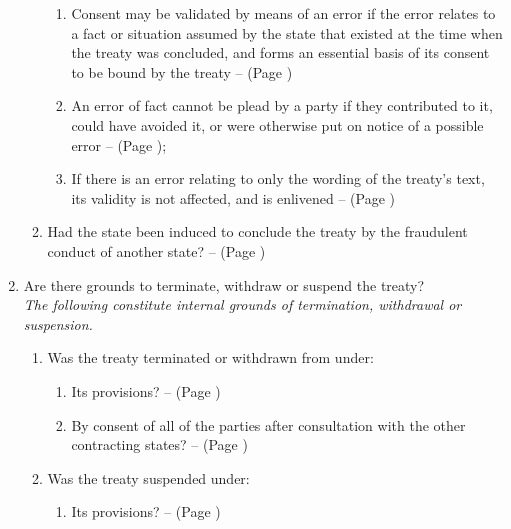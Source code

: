 \begin{enumerate}
\begin{enumerate}
        \begin{enumerate}
            \item Consent may be validated by means of an error if the error relates to a fact or situation assumed by the state that existed at the time when the treaty was concluded, and forms an essential basis of its consent to be bound by the treaty --  (Page \pageref{VCLT Art 48})
            \item An error of fact cannot be plead by a party if they contributed to it, could have avoided it, or were otherwise put on notice of a possible error --  (Page \pageref{VCLT Art 48}); 
            \item If there is an error relating to only the wording of the treaty's text, its validity is not affected, and  is enlivened --  (Page \pageref{VCLT Art 48})
        \end{enumerate}
        \item Had the state been induced to conclude the treaty by the fraudulent conduct of another state? --  (Page \pageref{VCLT Art 49})
    \end{enumerate}
    \item Are there grounds to terminate, withdraw or suspend the treaty? \\\vspace{8pt}
    \textit{The following constitute internal grounds of termination, withdrawal or suspension.}
    \begin{enumerate}
        \item Was the treaty terminated or withdrawn from under:
        \begin{enumerate}
            \item Its provisions? --  (Page \pageref{VCLT Art 54})
            \item By consent of all of the parties after consultation with the other contracting states? --  (Page \pageref{VCLT Art 54})
        \end{enumerate}
        \item Was the treaty suspended under:
        \begin{enumerate}
            \item Its provisions? --  (Page \pageref{VCLT Art 57})

\end{enumerate}
\end{enumerate}
\end{enumerate}
